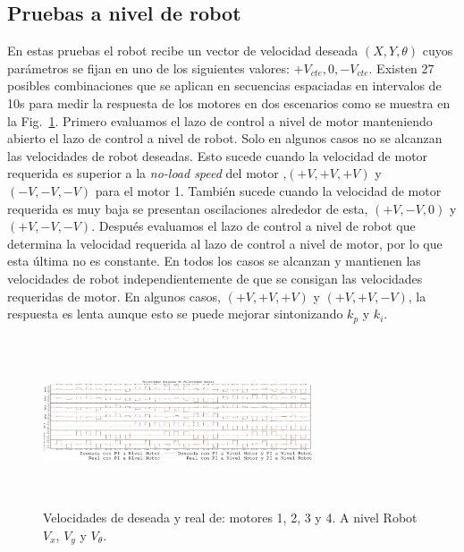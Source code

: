 \documentclass[twocolumn,10pt]{amrob}
\newcommand{\NOTE}[1]{{\color{blue}{Note: {#1}}}}
\begin{document}
\subsection*{Pruebas a nivel de robot}
En estas pruebas el robot recibe un vector de velocidad deseada $(X, Y,\theta)$ cuyos parámetros se fijan en uno de los siguientes valores: $+V_{cte}, 0, -V_{cte}$. Existen 27 posibles combinaciones que se aplican en secuencias espaciadas en intervalos de 10s para medir la respuesta de los motores en dos escenarios como se muestra en la Fig.~\ref{fig:realVSdes}. Primero evaluamos el lazo de control a nivel de motor manteniendo abierto el lazo de control a nivel de robot. Solo en algunos casos no se alcanzan las velocidades de robot deseadas. Esto sucede cuando la velocidad de motor requerida es superior a la \emph{no-load speed} del motor ,$(+V, +V, +V )$ y $(-V, -V, -V) $ para el motor 1. También sucede cuando la velocidad de motor requerida es muy baja se presentan oscilaciones alrededor de esta, $(+V, -V, 0) $ y  $(+V, -V, -V)$. Después evaluamos el lazo de control a nivel de robot que determina la velocidad requerida al lazo de control a nivel de motor, por lo que esta última no es constante. En todos los casos se alcanzan y mantienen las velocidades de robot independientemente de que se consigan  las velocidades requeridas de motor. En algunos casos, $(+V, +V, +V )$ y $(+V, +V, -V)$, la respuesta es lenta aunque esto se puede mejorar sintonizando $k_p$ y $k_i$.

\begin{figure}
  \centering
    \includegraphics[height=5cm,width=8cm]{160517-vels-motVSmotrob.eps}
  \caption{Velocidades de deseada y real de: motores 1, 2, 3 y 4. A nivel Robot $V_x$, $V_y$ y $V_\theta$. }
  \label{fig:realVSdes}
\end{figure}
\end{document}
